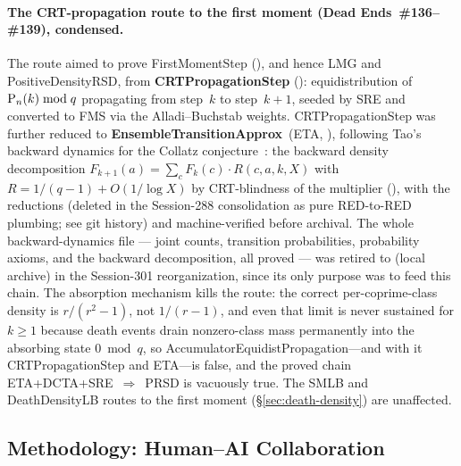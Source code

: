 \paragraph{The CRT-propagation route to the first moment (Dead
Ends~\#136--\#139), condensed.}
The route aimed to prove FirstMomentStep
(), and hence
LMG and PositiveDensityRSD, from \textbf{CRTPropagationStep}
(): equidistribution
of $\mathrm{P}_{n}(k) \bmod q$ propagating from step~$k$ to step~$k{+}1$,
seeded by SRE and converted to FMS via the Alladi--Buchstab weights.
CRTPropagationStep was further reduced to
\textbf{EnsembleTransitionApprox}~(ETA,
),
following Tao's backward dynamics for the Collatz
conjecture~\cite{Tao2019Collatz}: the backward density decomposition
$F_{k+1}(a) = \sum_c F_k(c) \cdot R(c,a,k,X)$ with
$R = 1/(q{-}1) + O(1/\log X)$ by CRT-blindness of the multiplier
(), with the
reductions  (deleted in the
Session-288 consolidation as pure RED-to-RED plumbing; see git history)
and
machine-verified before archival.  The whole backward-dynamics file ---
joint counts, transition probabilities, probability axioms, and the
backward decomposition, all proved --- was retired to
 (local archive) in the
Session-301 reorganization, since its only purpose was to feed this
chain.  The absorption mechanism kills the route: the correct
per-coprime-class density is $r/(r^2{-}1)$, not $1/(r{-}1)$, and even
that limit is never sustained for $k \geq 1$ because death events
drain nonzero-class mass permanently into the absorbing state
$0 \bmod q$, so AccumulatorEquidistPropagation---and with it
CRTPropagationStep and ETA---is false, and the proved chain
ETA+DCTA+SRE~$\Rightarrow$~PRSD is vacuously true.  The SMLB and
DeathDensityLB routes to the first moment
(\S\ref{sec:death-density}) are unaffected.

\subsection{Methodology: Human--AI Collaboration}
\label{app:agents}

